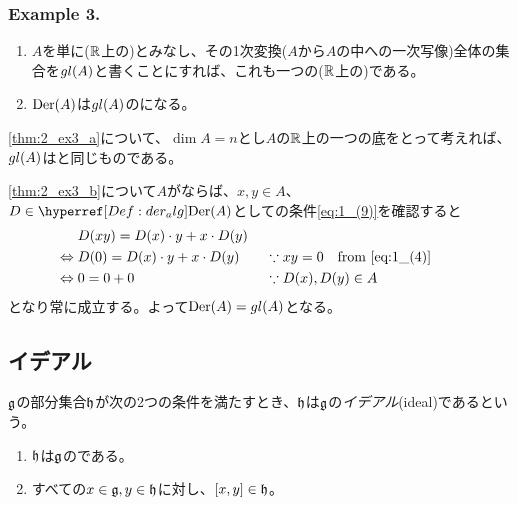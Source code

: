 \documentclass[fleqn,twocolumn,titlepage,dvipdfmx]{jsarticle}
\begin{document}
\subsubsection*{Example 3.}
\begin{theorem}\label{thm:gl}
  \begin{enumerate}[label=(\alph*)]
    \item \label{thm:2_ex3_a}$A$を単に($\mathbb{R}$上の)とみなし、その1次変換($A$から$A$の中への一次写像)全体の集合を$gl(A)$と書くことにすれば、これも一つの($\mathbb{R}$上の){}である。
    \item \label{thm:2_ex3_b}\href{Def:der_alg}{$\operatorname{Der}(A)$}は$gl(A)$の{}になる。
  \end{enumerate}
\end{theorem}

\begin{remark}
  \ref{thm:2_ex3_a}について、$\dim A=n$とし$A$の$\mathbb{R}$上の一つの底をとって考えれば、$gl(A)$はと同じものである。
\end{remark}

\begin{Proof}
  \ref{thm:2_ex3_b}について$A$がならば、$x,y\in A$、$D\in\href{Def:der_alg}{\Der(A)}$として{}の条件\eqref{eq:1_(9)}を確認すると
  \begin{align*}
    &D(xy) = D(x)\cdot y + x\cdot D(y)& \\
    \Leftrightarrow\;& D(0) = D(x)\cdot y + x\cdot D(y) &\;&\because xy=0\qq{from \eqref{eq:1_(4)}} \\
    \Leftrightarrow\;& 0 = 0+0 &\;&\because D(x),D(y)\in A
  \end{align*}
  となり常に成立する。よって$\operatorname{Der}(A)=gl(A)$となる。
\end{Proof}

\subsection{イデアル}

\begin{definition}[イデアル]\label{Def:2_2}
  $\mathfrak{g}$の部分集合$\mathfrak{h}$が次の2つの条件を満たすとき、$\mathfrak{h}$は$\mathfrak{g}$の\emph{イデアル}(ideal)であるという。
  \begin{enumerate}[label=(\roman*)$^\prime$]
    \item \label{Def:2_2_i'}$\mathfrak{h}$は$\mathfrak{g}$の{}である。
    \item \label{Def:2_2_ii'}すべての$x\in\mathfrak{g},y\in\mathfrak{h}$に対し、$\comm{x}{y}\in\h$。
  \end{enumerate}
\end{definition}
\end{document}
